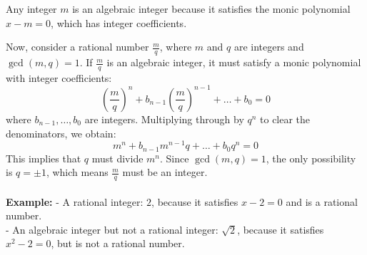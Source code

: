 \documentclass{article}
\newenvironment{proofbox}
  {\begin{mdframed}[linewidth=1pt,linecolor=black,backgroundcolor=white]\noindent\ignorespaces}
  {\end{mdframed}}
\begin{document}


\begin{proofbox}
   Any integer \( m \) is an algebraic integer because it satisfies the monic polynomial \( x - m = 0 \), which has integer coefficients.
    
    Now, consider a rational number \( \frac{m}{q} \), where \( m \) and \( q \) are integers and \( \gcd(m, q) = 1 \). If \( \frac{m}{q} \) is an algebraic integer, it must satisfy a monic polynomial with integer coefficients:
    \[
    \left( \frac{m}{q} \right)^n + b_{n-1} \left( \frac{m}{q} \right)^{n-1} + \dots + b_0 = 0
    \]
    where \( b_{n-1}, \dots, b_0 \) are integers. Multiplying through by \( q^n \) to clear the denominators, we obtain:
    \[
    m^n + b_{n-1} m^{n-1} q + \dots + b_0 q^n = 0
    \]
    This implies that \( q \) must divide \( m^n \). Since \( \gcd(m, q) = 1 \), the only possibility is \( q = \pm 1 \), which means \( \frac{m}{q} \) must be an integer.\\\\
        \textbf{Example:}
    - A rational integer: \( 2 \), because it satisfies \( x - 2 = 0 \) and is a rational number.\\
    - An algebraic integer but not a rational integer: \( \sqrt{2} \), because it satisfies \( x^2 - 2 = 0 \), but is not a rational number.
\end{proofbox}
\end{document}
